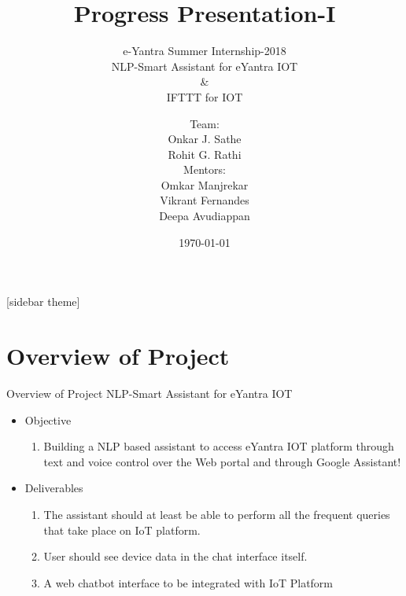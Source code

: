 \documentclass[10pt, a4paper]{beamer}
\begin{document}
	\title{Progress Presentation-I}
	\subtitle{e-Yantra Summer Internship-2018
	\vspace{0.1cm}
	\\ NLP-Smart Assistant for eYantra IOT
	\\\&
	\\IFTTT for IOT}
	\author{
	Team:
	\\Onkar J. Sathe
	\\Rohit G. Rathi
	\vspace{0.2cm}
	\\Mentors:
	\\Omkar Manjrekar
	\\Vikrant Fernandes
	\\Deepa Avudiappan}
	\date{\today}
	\frame{\titlepage}

[sidebar theme]
\section{Overview of Project}
\begin{frame}{Overview of Project}
	NLP-Smart Assistant for eYantra IOT
	\begin{itemize}
		\item Objective
		\begin{enumerate}	
			\item Building a NLP based assistant to access eYantra IOT platform  through text and voice control over the Web portal and through Google Assistant!
		\end{enumerate}
		\item Deliverables 
		\begin{enumerate}
			\item The assistant should at least be able to perform all the frequent queries that take place on IoT platform.
			\item User should see device data in the chat interface itself.
			\item A web chatbot interface to be integrated with IoT Platform
		\end{enumerate}
	\end{itemize}
\end{frame}
\end{document}
